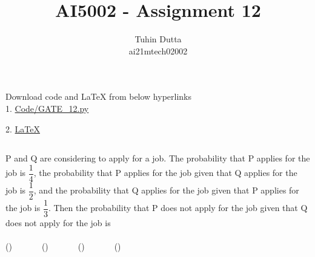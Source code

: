 \documentclass[journal,12pt,twocolumn]{IEEEtran}
\begin{document}
\providecommand{\mtx}[1]{\mathbf{#1}}
\providecommand{\fourier}{\overset{\mathcal{F}}{ \rightleftharpoons}}
\providecommand{\system}{\overset{\mathcal{H}}{ \longleftrightarrow}}
\newcommand{\solution}{\noindent \textbf{Solution: }}
\newcommand{\cosec}{\,\text{cosec}\,}
\providecommand{\dec}[2]{\ensuremath{\overset{#1}{\underset{#2}{\gtrless}}}}
\newcommand{\myvec}[1]{\ensuremath{\begin{pmatrix}#1\end{pmatrix}}}
\newcommand{\mydet}[1]{\ensuremath{\begin{vmatrix}#1\end{vmatrix}}}
\makeatletter
{}
\makeatother
\let\StandardTheFigure\thefigure
\let\vec\mathbf
\renewcommand{\thefigure}{\theproblem}
\def\putbox#1#2#3{\makebox[0in][l]{\makebox[#1][l]{}\raisebox{\baselineskip}[0in][0in]{\raisebox{#2}[0in][0in]{#3}}}}
     \def\rightbox#1{\makebox[0in][r]{#1}}
     \def\centbox#1{\makebox[0in]{#1}}
     \def\topbox#1{\raisebox{-\baselineskip}[0in][0in]{#1}}
     \def\midbox#1{\raisebox{-0.5\baselineskip}[0in][0in]{#1}}
\vspace{3cm}
\title{AI5002 - Assignment 12}
\author{Tuhin Dutta\\ ai21mtech02002}
\maketitle
\newpage
\bigskip
\renewcommand{\thefigure}{\theenumi}
\renewcommand{\thetable}{\theenumi}
\begin{mdframed}
Download code and LaTeX from below hyperlinks\\
1. \href{https://github.com/Tauhait/AI5002/blob/main/Assignment-12/Code/GATE_12.py}{Code/GATE\_12.py}


2. \href{https://github.com/Tauhait/AI5002/tree/main/Assignment-12/LaTeX}{LaTeX}
\end{mdframed}
\subsection*{}
P and Q are considering to apply for a job. The probability that P applies for the job is $\dfrac{1}{4}$, the probability that P applies for the job given that Q applies for the job is $\dfrac{1}{2}$, and the probability that Q applies for the job given that P applies for the job is $\dfrac{1}{3}$. Then the probability that P does not apply for the job given that Q does not apply for the job is\\
\\
()\ \ \ \ \ \ \ ()\ \ \ \ \ \ \ ()\ \ \ \ \ \ \ ()\ \ \ \ \ \ \
\end{document}
